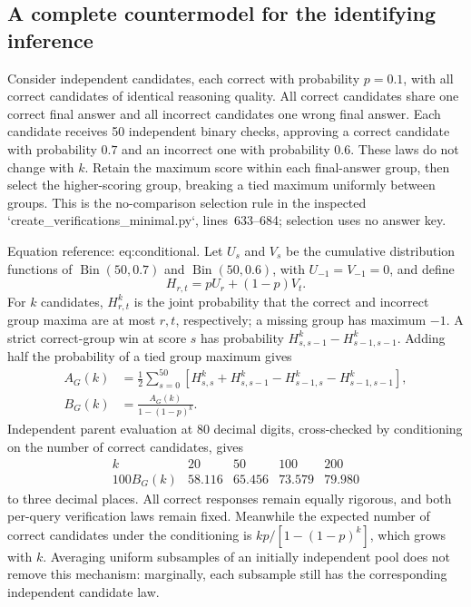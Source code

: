 \documentclass[10pt]{article}
\begin{document}
\subsection*{A complete countermodel for the identifying inference}
Consider independent candidates, each correct with probability \(p=0.1\), with all correct candidates of identical reasoning quality. All correct candidates share one correct final answer and all incorrect candidates one wrong final answer. Each candidate receives 50 independent binary checks, approving a correct candidate with probability \(0.7\) and an incorrect one with probability \(0.6\). These laws do not change with \(k\). Retain the maximum score within each final-answer group, then select the higher-scoring group, breaking a tied maximum uniformly between groups. This is the no-comparison selection rule in the inspected `create\_verifications\_minimal.py`, lines 633–684; selection uses no answer key.\par
Equation reference: eq:conditional. Let \(U_s\) and \(V_s\) be the cumulative distribution functions of \(\operatorname{Bin}(50,0.7)\) and \(\operatorname{Bin}(50,0.6)\), with \(U_{-1}=V_{-1}=0\), and define \[H_{r,t}=pU_r+(1-p)V_t .\] For \(k\) candidates, \(H_{r,t}^k\) is the joint probability that the correct and incorrect group maxima are at most \(r,t\), respectively; a missing group has maximum \(-1\). A strict correct-group win at score \(s\) has probability \(H_{s,s-1}^k-H_{s-1,s-1}^k\). Adding half the probability of a tied group maximum gives \[\begin{aligned}
 A_G(k)&=\frac12\sum_{s=0}^{50}
 \left[H_{s,s}^k+H_{s,s-1}^k-H_{s-1,s}^k-H_{s-1,s-1}^k\right],\\
 B_G(k)&=\frac{A_G(k)}{1-(1-p)^k}.
 \end{aligned}\] Independent parent evaluation at 80 decimal digits, cross-checked by conditioning on the number of correct candidates, gives \[\begin{array}{c|rrrr}
 k&20&50&100&200\\ \hline
 100B_G(k)&58.116&65.456&73.579&79.980
\end{array}\] to three decimal places. All correct responses remain equally rigorous, and both per-query verification laws remain fixed. Meanwhile the expected number of correct candidates under the conditioning is \(kp/[1-(1-p)^k]\), which grows with \(k\). Averaging uniform subsamples of an initially independent pool does not remove this mechanism: marginally, each subsample still has the corresponding independent candidate law.\par
\end{document}
